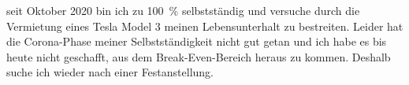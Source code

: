 		seit Oktober 2020 bin ich zu \SI{100}{\percent} selbstständig und versuche durch die Vermietung eines Tesla Model 3 meinen Lebensunterhalt zu bestreiten.
		Leider hat die Corona-Phase meiner Selbstständigkeit nicht gut getan und ich habe es bis heute nicht geschafft, aus dem Break-Even-Bereich heraus zu kommen.
		Deshalb suche ich wieder nach einer Festanstellung.